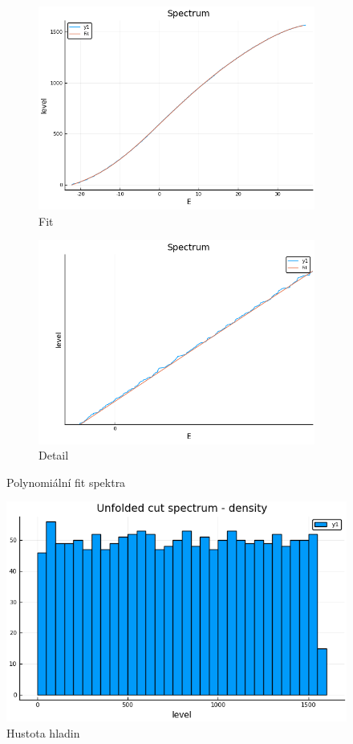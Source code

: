 \documentclass{article}
\begin{document}
\begin{figure}[H]
    \centering
    \begin{subfigure}{.5\textwidth}
      \centering
      \includegraphics[width=.95\linewidth]{Fit.png}
      \caption{Fit}
      \label{fig:sub1}
    \end{subfigure}%
    \begin{subfigure}{.5\textwidth}
      \centering
      \includegraphics[width=.95\linewidth]{detail.png}
      \caption{Detail}
      \label{fig:sub2}
    \end{subfigure}
    \caption{Polynomiální fit spektra}
    \label{fig:test}
    \end{figure}


    \begin{figure}[H]
          \centering
          \includegraphics[width=.5\linewidth]{unfolded.png}
          \caption{Hustota hladin}
    \end{figure}
\end{document}
